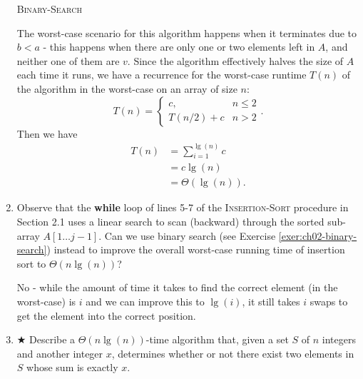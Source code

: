 \documentclass[Chapter02]{subfiles}
\begin{document}
\begin{enumerate}[leftmargin=\labelsep]
\begin{answer}
			\begin{algorithm}[H]
				\caption{\textsc{Binary-Search}}
				\label{alg:ch02-binary-search}

			\end{algorithm}

			The worst-case scenario for this algorithm happens when it terminates due to $b < a$ - this happens when there are only one or two elements left in $A$, and neither one of them are $v$. Since the algorithm effectively halves the size of $A$ each time it runs, we have a recurrence for the worst-case runtime $T(n)$ of the algorithm in the worst-case on an array of size $n$:
			\[
				T(n) =
				\begin{cases}
					c, &n \leq 2\\
					T(n/2) + c &n > 2
				\end{cases}.
			\]
			Then we have
			\begin{align*}
				T(n) &= \sum_{i = 1}^{\lg(n)} c\\
				     &= c\lg(n)\\
				     &= \Theta(\lg(n)).
			\end{align*}
		\end{answer}

		\item Observe that the \textbf{while} loop of lines 5-7 of the \textsc{Insertion-Sort} procedure in Section 2.1 uses a linear search to scan (backward) through the sorted sub-array $A[1 \dots j - 1]$. Can we use binary search (see Exercise \ref{exer:ch02-binary-search}) instead to improve the overall worst-case running time of insertion sort to $\Theta(n \lg(n))$?
		\begin{answer}
			No - while the amount of time it takes to find the correct element (in the worst-case) is $i$ and we can improve this to $\lg(i)$, it still takes $i$ swaps to get the element into the correct position.
		\end{answer}

		\item $\bigstar$ Describe a $\Theta(n \lg(n))$-time algorithm that, given a set $S$ of $n$ integers and another integer $x$, determines whether or not there exist two elements in $S$ whose sum is exactly $x$.
		\begin{answer}
			\hfill\\
			\begin{algorithm}[H]


\end{algorithm}
\end{answer}
\end{enumerate}
\end{document}
